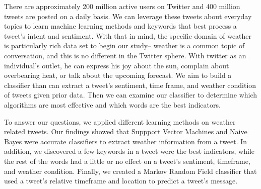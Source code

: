 There are approximately 200 million active users on Twitter and 400 million tweets are posted on a daily basis. We can leverage these tweets about everyday topics to learn machine learning methods and keywords that best process a tweet's intent and sentiment. With that in mind, the specific domain of weather is particularly rich data set to begin our study– weather is a common topic of conversation, and this is no different in the Twitter sphere. With twitter as an individual's outlet, he can express his joy about the sun, complain about overbearing heat, or talk about the upcoming forecast. We aim to build a classifier than can extract a tweet's sentiment, time frame, and weather condition of tweets given prior data. Then we can examine our classifier to determine which algorithms are most effective and which words are the best indicators.

To answer our questions, we applied different learning methods on weather related tweets. Our findings showed that Suppport Vector Machines and Naive Bayes were accurate classifiers to extract weather information from a tweet. In addition, we discovered a few keywords in a tweet were the best indicators, while the rest of the words had a little or no effect on a tweet's sentiment, timeframe, and weather condition. Finally, we created a Markov Random Field classifier that used a tweet's relative timeframe and location to predict a tweet's message.